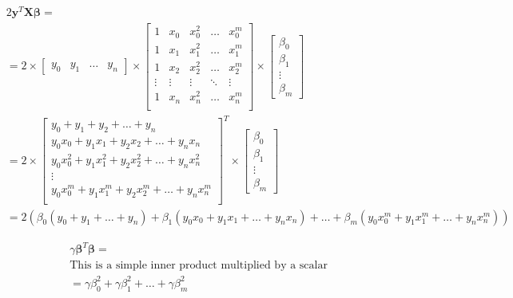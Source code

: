 \documentclass{article}
\newcommand{\y}{\mathbf{y}}
\newcommand{\X}{\mathbf{X}}
\newcommand{\B}{\boldsymbol\beta} %
\begin{document}
\begin{equation} \label{eqn:2bax}
\begin{split}
    & 2 \y ^T \X \B = \\
    & = 2 \times
    \begin{bmatrix}
        y_0 &
        y_1 &
        \ldots & 
        y_n
    \end{bmatrix}
    \times
    \begin{bmatrix}
        1 & x_0 & x_0 ^2 & \ldots & x_0^m \\
        1 & x_1 & x_1 ^2 & \ldots & x_1^m \\
        1 & x_2 & x_2 ^2 & \ldots & x_2^m \\
        \vdots & \vdots & \vdots & \ddots & \vdots \\
        1 & x_n & x_n ^2 & \ldots & x_n^m \\
    \end{bmatrix}
    \times
    \begin{bmatrix}
        \beta_0\\
        \beta_1\\
        \vdots\\
        \beta_m
    \end{bmatrix}\\
    & = 2 \times
    \begin{bmatrix}
        y_0 + y_1 + y_2 + \ldots + y_n \\
        y_0 x_0 + y_1 x_1 + y_2 x_2 + \ldots + y_n x_n \\
        y_0 x_0^2 + y_1 x_1^2 + y_2 x_2^2 + \ldots + y_n x_n^2 \\
        \vdots\\
        y_0 x_0^m + y_1 x_1^m + y_2 x_2^m + \ldots + y_n x_n^m \\
    \end{bmatrix} ^T
    \times
    \begin{bmatrix}
        \beta_0\\
        \beta_1\\
        \vdots\\
        \beta_m
    \end{bmatrix}\\
    & = 2(\beta_0 (y_0 + y_1 + \ldots + y_n) + \beta_1 (y_0 x_0 + y_1 x_1 + \ldots + y_n x_n) + \ldots + \beta_m (y_0 x_0^m + y_1 x_1^m + \ldots + y_n x_n^m))
\end{split}
\end{equation}

\begin{equation} \label{eqn:gxx}
\begin{split}
    & \gamma \B ^T \B = \\
    & \text{This is a simple inner product multiplied by a scalar} \\
    & = \gamma \beta_0 ^2 + \gamma \beta_1 ^2 + \ldots + \gamma \beta_m^2
\end{split}
\end{equation}
\end{document}
